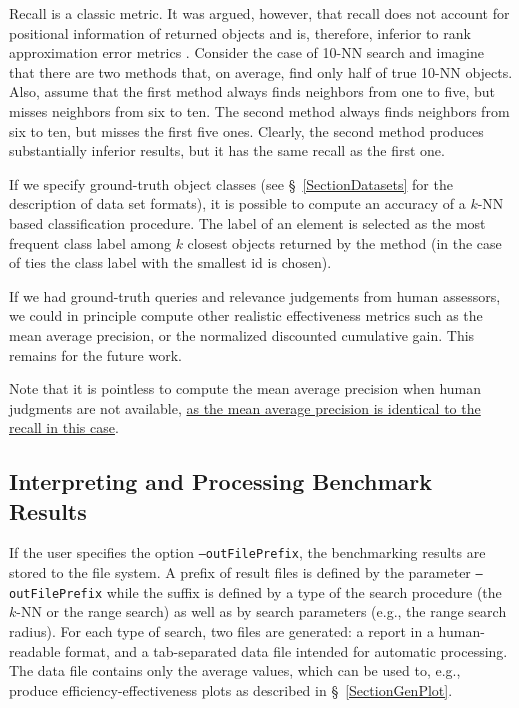 \documentclass[runningheads,a4paper]{llncs}
\newcommand{\ttt}[1]{\texttt{#1}}
\newcommand{\knn}{$k$-NN }
\begin{document}
{Recall is a classic metric. 
It was argued, however, 
that recall does not account for positional information of returned objects
and is, therefore, inferior to rank approximation error metrics \cite{Amato_et_al:2003,Cayton2008}.
Consider the case of 10-NN search and imagine that there are two methods
that, on average, find only half of true 10-NN objects.
Also, assume that the first method always finds neighbors from one to five,
but misses neighbors from six to ten.
The second method always finds neighbors from six to ten, but misses the first five ones.
Clearly, the second method produces substantially inferior results, but it has the same recall as the first one.

If we specify ground-truth object classes (see \S~\ref{SectionDatasets} 
for the description of data set formats), 
it is possible to compute an accuracy of a \knn based classification procedure.
The label of an element is selected as the most frequent class label among $k$ closest objects
returned by the method (in the case of ties the class label with the smallest id is chosen).

If we had ground-truth queries and relevance judgements from human assessors,
we could in principle compute other realistic effectiveness metrics 
such as the mean average precision,
or the normalized discounted cumulative gain.
This remains for the future work.

Note that it is pointless to compute the mean average precision
when human judgments are not available, \href{http://searchivarius.org/blog/when-average-precision-equal-recall}{as the mean average precision
is identical to the recall in this case}.

\subsection{Interpreting and Processing Benchmark Results}
If the user specifies the option \ttt{--outFilePrefix},
the benchmarking results are stored to the file system.
A prefix of result files is defined by the parameter \ttt{--outFilePrefix}
while the suffix is defined by a type of the search procedure (the \knn or the range search)
as well as by search parameters (e.g., the range search radius).
For each type of search, two files are generated:
a report in a human-readable format,
and a tab-separated data file intended for automatic processing.
The data file contains only the average values,
which can be used to, e.g., produce efficiency-effectiveness plots
as described in \S~\ref{SectionGenPlot}.

}
\end{document}
